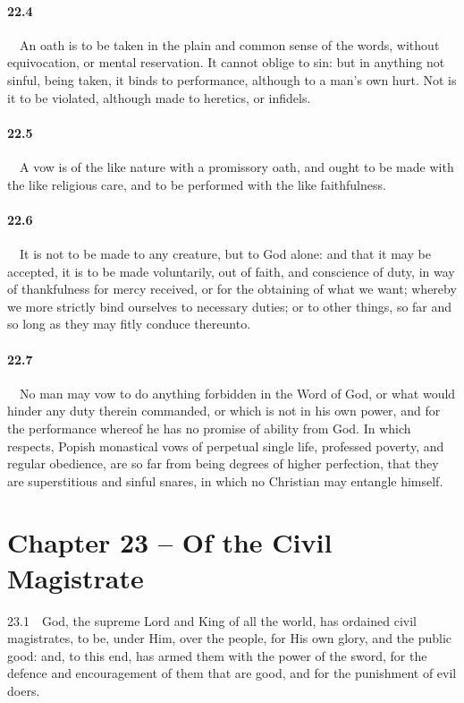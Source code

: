 \paragraph{22.4}\ \ An oath is to be taken in the plain and common sense of the words, without equivocation, or mental reservation. It cannot oblige to sin: but in anything not sinful, being taken, it binds to performance, although to a man's own hurt. Not is it to be violated, although made to heretics, or infidels.   
\bigskip
\paragraph{22.5}\ \ A vow is of the like nature with a promissory oath, and ought to be made with the like religious care, and to be performed with the like faithfulness.   
\bigskip
\paragraph{22.6}\ \ It is not to be made to any creature, but to God alone: and that it may be accepted, it is to be made voluntarily, out of faith, and conscience of duty, in way of thankfulness for mercy received, or for the obtaining of what we want; whereby we more strictly bind ourselves to necessary duties; or to other things, so far and so long as they may fitly conduce thereunto.   
\bigskip
\paragraph{22.7}\ \ No man may vow to do anything forbidden in the Word of God, or what would hinder any duty therein commanded, or which is not in his own power, and for the performance whereof he has no promise of ability from God. In which respects, Popish monastical vows of perpetual single life, professed poverty, and regular obedience, are so far from being degrees of higher perfection, that they are superstitious and sinful snares, in which no Christian may entangle himself.  

\section{Chapter 23 -- Of the Civil Magistrate} 23.1\ \ God, the supreme Lord and King of all the world, has ordained civil magistrates, to be, under Him, over the people, for His own glory, and the public good: and, to this end, has armed them with the power of the sword, for the defence and encouragement of them that are good, and for the punishment of evil doers.   
\bigskip
